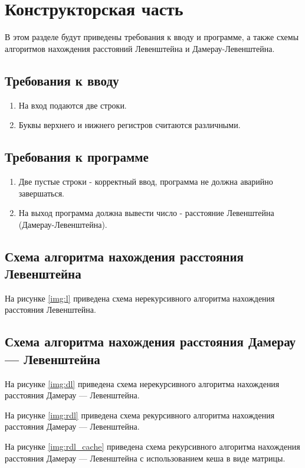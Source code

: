\chapter{Конструкторская часть}
В этом разделе будут приведены требования к вводу и программе, а также схемы алгоритмов нахождения расстояний Левенштейна и Дамерау-Левенштейна.

\section{Требования к вводу}
\begin{enumerate}
	\item На вход подаются две строки.
	\item Буквы верхнего и нижнего регистров считаются различными.
\end{enumerate}

\section{Требования к программе}
\begin{enumerate}
	\item Две пустые строки - корректный ввод, программа не должна аварийно завершаться.
	\item На выход программа должна вывести число - расстояние Левенштейна (Дамерау-Левенштейна).
\end{enumerate}

\section{Схема алгоритма нахождения расстояния Левенштейна}

На рисунке \ref{img:l} приведена схема нерекурсивного алгоритма нахождения расстояния Левенштейна.

\section{Схема алгоритма нахождения расстояния Дамерау — Левенштейна}

На рисунке \ref{img:dl} приведена схема нерекурсивного алгоритма нахождения расстояния Дамерау — Левенштейна.

На рисунке \ref{img:rdl} приведена схема рекурсивного алгоритма нахождения расстояния Дамерау — Левенштейна.

На рисунке \ref{img:rdl_cache} приведена схема рекурсивного алгоритма нахождения расстояния Дамерау — Левенштейна с использованием кеша в виде матрицы.

